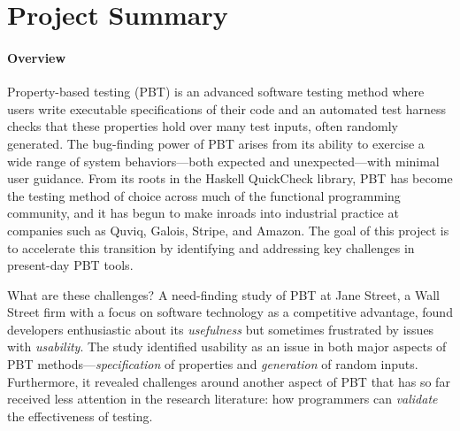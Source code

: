 \section*{Project Summary}

\paragraph*{Overview}
Property-based testing (PBT) is an advanced software testing
method where users write executable specifications of their code
and an automated test harness checks that these properties hold over
many test inputs, often randomly generated.  The bug-finding power of PBT arises
from its ability to exercise a wide range of system behaviors---both
expected and unexpected---with minimal user guidance.
%
From its roots in the Haskell QuickCheck library, PBT has become
the testing method of choice across much of the functional programming
community, and it has begun to make inroads into industrial practice
at companies such as Quviq, Galois, Stripe, and Amazon.\iflater{}\fi{}
%
The goal of this project is to accelerate this transition
by identifying and addressing key challenges in
present-day PBT tools.

What are these challenges?
A need-finding study of PBT at Jane
Street, a Wall Street firm with a focus on software
technology as a competitive advantage, found developers enthusiastic
about its {\em usefulness} but
sometimes frustrated by issues with {\em usability}.
%
The study identified usability as an issue in both major aspects
of PBT methods---{\em specification} of properties and {\em
  generation} of random inputs. Furthermore, it revealed challenges
around another aspect of PBT that has so far received less attention in the
research literature: how programmers can {\em validate} the
effectiveness of testing.


